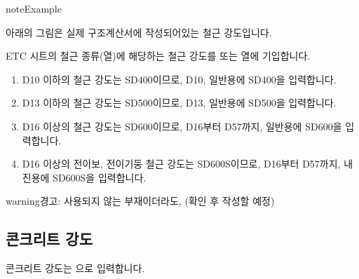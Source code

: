 \documentclass[a4paper,11pt,korean,openany,oneside]{sphinxmanual}
\begin{document}
\begin{sphinxadmonition}{note}{Example}

\sphinxAtStartPar
아래의 그림은 실제 구조계산서에 작성되어있는 철근 강도입니다.

\begin{figure}[H]
\centering
\capstart

\noindent{}
\caption{}\label{\detokenize{2_etc:id6}}\end{figure}

\sphinxAtStartPar
ETC 시트의 철근 종류(열)에 해당하는 철근 강도를  또는 열에 기입합니다.

\begin{enumerate}
%
\item {} 
\sphinxAtStartPar
D10 이하의 철근 강도는 SD400이므로, D10, 일반용에 SD400을 입력합니다.

\item {} 
\sphinxAtStartPar
D13 이하의 철근 강도는 SD500이므로, D13, 일반용에 SD500을 입력합니다.

\item {} 
\sphinxAtStartPar
D16 이상의 철근 강도는 SD600이므로, D16부터 D57까지, 일반용에 SD600을 입력합니다.

\item {} 
\sphinxAtStartPar
D16 이상의 전이보, 전이기둥 철근 강도는 SD600S이므로, D16부터 D57까지, 내진용에 SD600S을 입력합니다.

\end{enumerate}

\begin{sphinxadmonition}{warning}{경고:}
\sphinxAtStartPar
사용되지 않는 부재이더라도, (확인 후 작성할 예정)
\end{sphinxadmonition}
\end{sphinxadmonition}


\subsection{콘크리트 강도}
\label{\detokenize{2_etc:id2}}
\sphinxAtStartPar
콘크리트 강도는 으로 입력합니다.
\end{document}
